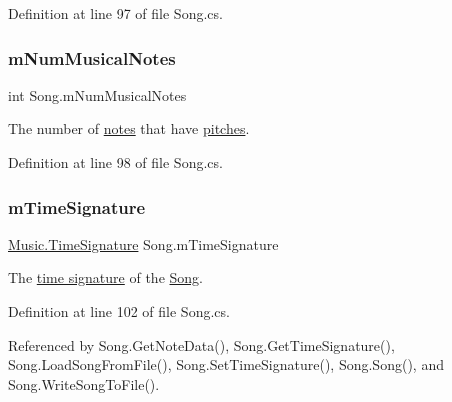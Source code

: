 Definition at line 97 of file Song.\+cs.

\mbox{\label{group___song_priv_var_gaf55b4fd2df0457ba1306a75ac3fdc8b1}} 
\subsubsection{\texorpdfstring{m\+Num\+Musical\+Notes}{mNumMusicalNotes}}
{\footnotesize\ttfamily int Song.\+m\+Num\+Musical\+Notes\hspace{0.3cm}{\ttfamily [private]}}



The number of \hyperlink{group___music_structs_struct_music_1_1_combined_note}{notes} that have \hyperlink{group___music_structs_struct_music_1_1_melody_note}{pitches}. 



Definition at line 98 of file Song.\+cs.

\mbox{\label{group___song_priv_var_ga2b2dcc0e83e49f7303b6a1371877b25e}} 
\subsubsection{\texorpdfstring{m\+Time\+Signature}{mTimeSignature}}
{\footnotesize\ttfamily \hyperlink{group___music_structs_struct_music_1_1_time_signature}{Music.\+Time\+Signature} Song.\+m\+Time\+Signature\hspace{0.3cm}{\ttfamily [private]}}



The \hyperlink{group___music_structs_struct_music_1_1_time_signature}{time signature} of the \hyperlink{class_song}{Song}. 



Definition at line 102 of file Song.\+cs.



Referenced by Song.\+Get\+Note\+Data(), Song.\+Get\+Time\+Signature(), Song.\+Load\+Song\+From\+File(), Song.\+Set\+Time\+Signature(), Song.\+Song(), and Song.\+Write\+Song\+To\+File().

